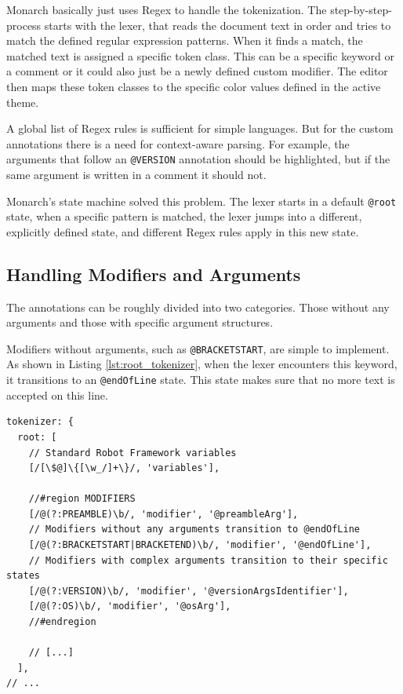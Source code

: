 Monarch basically just uses Regex to handle the tokenization. The step-by-step-process starts with the lexer, that reads the document text in order and tries  to match the defined regular expression patterns. When it finds a match, the matched text is assigned a specific token class. This can be a specific keyword or a comment or it could also just be a newly defined custom modifier. The editor then maps these token classes to the specific color values defined in the active theme.

A global list of Regex rules is sufficient for simple languages. But for the custom annotations there is a need for context-aware parsing. For example, the arguments that follow an \texttt{@VERSION} annotation should be highlighted, but if the same argument is written in a comment it should not.

Monarch's state machine solved this problem. The lexer starts in a default \texttt{@root} state, when a specific pattern is matched, the lexer jumps into a different, explicitly defined state, and different Regex rules apply in this new state.

\subsection{Handling Modifiers and Arguments}

The annotations can be roughly divided into two categories. Those without any arguments and those with specific argument structures.

Modifiers without arguments, such as \texttt{@BRACKETSTART}, are simple to implement. As shown in Listing \ref{lst:root_tokenizer}, when the lexer encounters this keyword, it transitions to an \texttt{@endOfLine} state. This state  makes sure that no more text is accepted on this line. 

\begin{lstlisting}[caption={Monarch tokenizers root state}, label={lst:root_tokenizer}]
tokenizer: {
  root: [
    // Standard Robot Framework variables
    [/[\$@]\{[\w_/]+\}/, 'variables'],

    //#region MODIFIERS
    [/@(?:PREAMBLE)\b/, 'modifier', '@preambleArg'],
    // Modifiers without any arguments transition to @endOfLine
    [/@(?:BRACKETSTART|BRACKETEND)\b/, 'modifier', '@endOfLine'], 
    // Modifiers with complex arguments transition to their specific states
    [/@(?:VERSION)\b/, 'modifier', '@versionArgsIdentifier'],
    [/@(?:OS)\b/, 'modifier', '@osArg'],
    //#endregion
    
    // [...]
  ],
// ...
\end{lstlisting}

